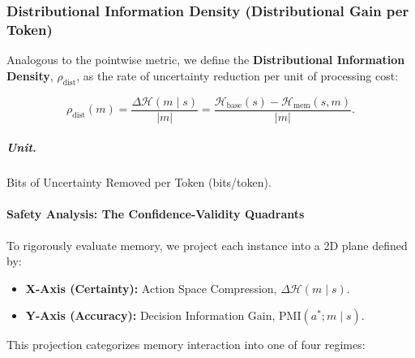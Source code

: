 \subsubsection{Distributional Information Density (Distributional Gain per Token)}

Analogous to the pointwise metric, we define the \textbf{Distributional Information Density}, $\rho_{\text{dist}}$, as the rate of uncertainty reduction per unit of processing cost:

\[
\rho_{\text{dist}}(m) = \frac{\Delta \mathcal{H}(m \mid s)}{|m|} 
= \frac{\mathcal{H}_{\text{base}}(s) - \mathcal{H}_{\text{mem}}(s, m)}{|m|}.
\]

\subparagraph{Unit.} Bits of Uncertainty Removed per Token (bits/token).

\paragraph{Safety Analysis: The Confidence-Validity Quadrants}

To rigorously evaluate memory, we project each instance into a 2D plane defined by:

\begin{itemize}
    \item \textbf{X-Axis (Certainty):} Action Space Compression, $\Delta \mathcal{H}(m \mid s)$.
    \item \textbf{Y-Axis (Accuracy):} Decision Information Gain, $\mathrm{PMI}(a^*; m \mid s)$.
\end{itemize}

This projection categorizes memory interaction into one of four regimes:

